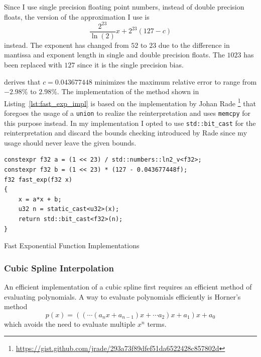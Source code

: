 \documentclass[a4paper, 11pt]{memoir}
\begin{document}
    Since I use single precision floating point numbers, instead of double precision floats, the version of the
    approximation I use is
    \begin{equation}
        \frac{2^{23}}{\ln{(2)}}x + 2^{23}(127 - c)
    \end{equation}
    instead. The exponent has changed from $52$ to $23$ due to the difference in mantissa and exponent length in single and
    double precision floats. The $1023$ has been replaced with $127$ since it is the single precision bias.

    \citeauthor{fast_exp} derives that $c = 0.043677448$ minimizes the maximum relative error to range from $-2.98\%$ to
    $2.98\%$. The implementation of the method shown in Listing~\ref{lst:fast_exp_impl} is based on the implementation
    by Johan Rade \footnote{\href{https://gist.github.com/jrade/293a73f89dfef51da6522428c857802d}{https://gist.github.com/jrade/293a73f89dfef51da6522428c857802d}}
    that foregoes the usage of a \texttt{union} to realize the reinterpretation and uses \texttt{memcpy}
    for this purpose instead. In my implementation I opted to use \texttt{std::bit_cast} for the reinterpretation
    and discard the bounds checking introduced by Rade since my usage should never leave the given bounds.

    \begin{listing}[t]
        \begin{verbatim}
constexpr f32 a = (1 << 23) / std::numbers::ln2_v<f32>;
constexpr f32 b = (1 << 23) * (127 - 0.043677448f);
f32 fast_exp(f32 x)
{
    x = a*x + b;
    u32 n = static_cast<u32>(x);
    return std::bit_cast<f32>(n);
}
        \end{verbatim}
        \caption{Fast Exponential Function Implementations}
        \label{lst:fast_exp_impl}
    \end{listing}
    
    \subsubsection{Cubic Spline Interpolation}
    \label{sec:impl_cubic_spline}
    An efficient implementation of a cubic spline first requires an efficient method of evaluating polynomials. A way to
    evaluate polynomials efficiently is Horner's method
    \begin{equation}
        p(x) = \left(\left(\cdots\left(a_nx + a_{n-1}\right)x + \cdots a_2\right)x + a_1\right)x + a_0
        \label{eq:horners_method}
    \end{equation}
    which avoids the need to evaluate multiple $x^n$ terms.
\end{document}

